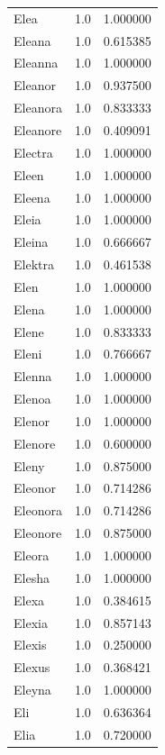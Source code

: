\documentclass[
  letterpaper,
  DIV=11,
  numbers=noendperiod]{scrreprt}
\begin{document}
\begin{tabular}{lrr}
Elea            &   1.0 &   1.000000 \\
Eleana          &   1.0 &   0.615385 \\
Eleanna         &   1.0 &   1.000000 \\
Eleanor         &   1.0 &   0.937500 \\
Eleanora        &   1.0 &   0.833333 \\
Eleanore        &   1.0 &   0.409091 \\
Electra         &   1.0 &   1.000000 \\
Eleen           &   1.0 &   1.000000 \\
Eleena          &   1.0 &   1.000000 \\
Eleia           &   1.0 &   1.000000 \\
Eleina          &   1.0 &   0.666667 \\
Elektra         &   1.0 &   0.461538 \\
Elen            &   1.0 &   1.000000 \\
Elena           &   1.0 &   1.000000 \\
Elene           &   1.0 &   0.833333 \\
Eleni           &   1.0 &   0.766667 \\
Elenna          &   1.0 &   1.000000 \\
Elenoa          &   1.0 &   1.000000 \\
Elenor          &   1.0 &   1.000000 \\
Elenore         &   1.0 &   0.600000 \\
Eleny           &   1.0 &   0.875000 \\
Eleonor         &   1.0 &   0.714286 \\
Eleonora        &   1.0 &   0.714286 \\
Eleonore        &   1.0 &   0.875000 \\
Eleora          &   1.0 &   1.000000 \\
Elesha          &   1.0 &   1.000000 \\
Elexa           &   1.0 &   0.384615 \\
Elexia          &   1.0 &   0.857143 \\
Elexis          &   1.0 &   0.250000 \\
Elexus          &   1.0 &   0.368421 \\
Eleyna          &   1.0 &   1.000000 \\
Eli             &   1.0 &   0.636364 \\
Elia            &   1.0 &   0.720000 \\

\end{tabular}
\end{document}
